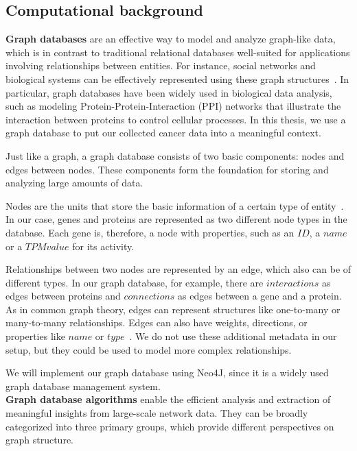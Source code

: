 \subsection{Computational background} \label{subsec:computational_background}
\textbf{Graph databases} are an effective way to model and analyze graph-like data,
which is in contrast to traditional relational databases well-suited for applications involving relationships between entities.
For instance, social networks and biological systems can be effectively represented using these graph structures~\cite{graph_db_survey}.
In particular, graph databases have been widely used in biological data analysis, such as modeling Protein-Protein-Interaction (PPI) networks
that illustrate the interaction between proteins to control cellular processes.
In this thesis, we use a graph database to put our collected cancer data into a meaningful context.

Just like a graph, a graph database consists of two basic components: nodes and edges between nodes.
These components form the foundation for storing and analyzing large amounts of data.

Nodes are the units that store the basic information of a certain type of entity~\cite{graph_db_survey}.
In our case, genes and proteins are represented as two different node types in the database.
Each gene is, therefore, a node with properties, such as an $ID$, a $name$ or a $TPM value$ for its activity.

Relationships between two nodes are represented by an edge, which also can be of different types.
In our graph database, for example, there are $interactions$ as edges between proteins and $connections$ as edges between a gene and a protein.
As in common graph theory, edges can represent structures like one-to-many or many-to-many relationships.
Edges can also have weights, directions, or properties like $name$ or $type$~\cite{graph_db_power_limitations}.
We do not use these additional metadata in our setup, but they could be used to model more complex relationships.

We will implement our graph database using Neo4J, since it is a widely used graph database management system.
\\

\textbf{Graph database algorithms} enable the efficient analysis and extraction of meaningful insights from large-scale network data.
They can be broadly categorized into three primary groups, which provide different perspectives on graph structure.

